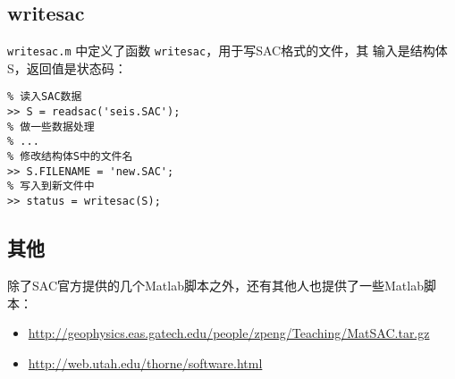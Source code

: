 \subsection{writesac}
\verb|writesac.m| 中定义了函数 \verb|writesac|，用于写SAC格式的文件，其
输入是结构体S，返回值是状态码：
\begin{verbatim}
% 读入SAC数据
>> S = readsac('seis.SAC');
% 做一些数据处理
% ...
% 修改结构体S中的文件名
>> S.FILENAME = 'new.SAC';
% 写入到新文件中
>> status = writesac(S);
\end{verbatim}

\subsection{其他}
除了SAC官方提供的几个Matlab脚本之外，还有其他人也提供了一些Matlab脚本：
\begin{itemize}
\item \url{http://geophysics.eas.gatech.edu/people/zpeng/Teaching/MatSAC.tar.gz}
\item \url{http://web.utah.edu/thorne/software.html}
\end{itemize}
